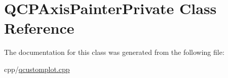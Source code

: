 \hypertarget{class_q_c_p_axis_painter_private}{}\section{Q\+C\+P\+Axis\+Painter\+Private Class Reference}
\label{class_q_c_p_axis_painter_private}


The documentation for this class was generated from the following file\+:\begin{DoxyCompactItemize}
\item 
cpp/\mbox{\hyperlink{qcustomplot_8cpp}{qcustomplot.\+cpp}}\end{DoxyCompactItemize}
